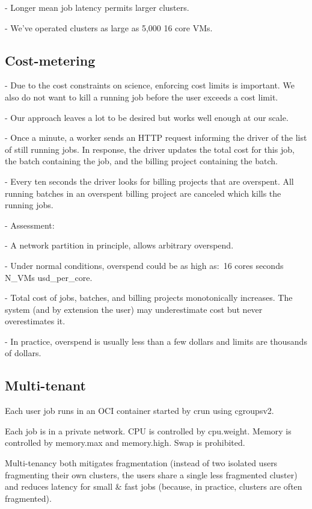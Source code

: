 \documentclass[sigconf, nonacm]{acmart}
\begin{document}
    - Longer mean job latency permits larger clusters.

    - We’ve operated clusters as large as 5,000 16 core VMs.

\subsection{Cost-metering}

    - Due to the cost constraints on science, enforcing cost limits is important. We also do not want to kill a running job before the user exceeds a cost limit.

    - Our approach leaves a lot to be desired but works well enough at our scale.

    - Once a minute, a worker sends an HTTP request informing the driver of the list of still running jobs. In response, the driver updates the total cost for this job, the batch containing the job, and the billing project containing the batch.

    - Every ten seconds the driver looks for billing projects that are overspent. All running batches in an overspent billing project are canceled which kills the running jobs.

    - Assessment:

      - A network partition in principle, allows arbitrary overspend.

      - Under normal conditions, overspend could be as high as:\
        16 cores  seconds \* N\_VMs \* usd\_per\_core.

      - Total cost of jobs, batches, and billing projects monotonically increases. The system (and by extension the user) may underestimate cost but never overestimates it.

      - In practice, overspend is usually less than a few dollars and limits are thousands of dollars.

\subsection{Multi-tenant}

Each user job runs in an OCI container started by crun using cgroupsv2.

Each job is in a private network. CPU is controlled by cpu.weight. Memory is controlled by memory.max and memory.high. Swap is prohibited.

Multi-tenancy both mitigates fragmentation (instead of two isolated users fragmenting their own clusters, the users share a single less fragmented cluster) and reduces latency for small \& fast jobs (because, in practice, clusters are often fragmented).
\end{document}
